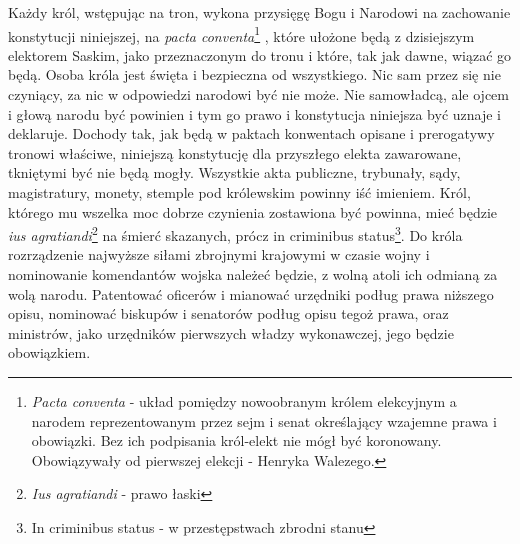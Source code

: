 \documentclass{book}
\begin{document}
 Każdy król, wstępując na tron, wykona przysięgę Bogu i Narodowi na zachowanie konstytucji niniejszej, na \textit{pacta conventa}\footnote{\textit{Pacta conventa} - układ pomiędzy nowoobranym królem elekcyjnym a narodem reprezentowanym przez sejm i senat określający wzajemne prawa i obowiązki.  Bez ich podpisania król-elekt nie mógł być koronowany.  Obowiązywały od pierwszej elekcji - Henryka Walezego. } , które ułożone będą z dzisiejszym elektorem Saskim, jako przeznaczonym do tronu i które, tak jak dawne, wiązać go będą.  Osoba króla jest święta i bezpieczna od wszystkiego.  Nic sam przez się nie czyniący, za nic w odpowiedzi narodowi być nie może.  Nie samowładcą, ale ojcem i głową narodu być powinien i tym go prawo i konstytucja niniejsza być uznaje i deklaruje.  Dochody tak, jak będą w paktach konwentach opisane i prerogatywy tronowi właściwe, niniejszą konstytucję dla przyszłego elekta zawarowane, tkniętymi być nie będą mogły.  Wszystkie akta publiczne, trybunały, sądy, magistratury, monety, stemple pod królewskim powinny iść imieniem.  Król, którego mu wszelka moc dobrze czynienia zostawiona być powinna, mieć będzie \textit{ius agratiandi}\footnote{\textit{Ius agratiandi} - prawo łaski} na śmierć skazanych, prócz in criminibus status\footnote{In criminibus status - w przestępstwach zbrodni stanu}.  Do króla rozrządzenie najwyższe siłami zbrojnymi krajowymi w czasie wojny i nominowanie komendantów wojska należeć będzie, z wolną atoli ich odmianą za wolą narodu.  Patentować oficerów i mianować urzędniki podług prawa niższego opisu, nominować biskupów i senatorów podług opisu tegoż prawa,  oraz ministrów, jako urzędników pierwszych władzy wykonawczej, jego będzie obowiązkiem.  
\end{document}
